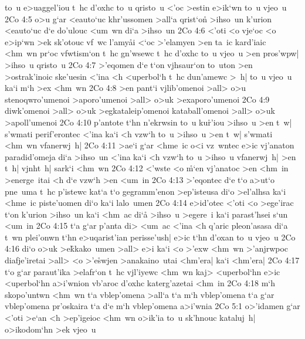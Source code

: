 to~u
e>uaggel'iou
t~hc
d'oxhc
to~u
qristo~u
<'oc
>estin
e>ik`wn
to~u
vjeo~u\bibvsend
\vs 2Co 4:5
o>u
g`ar
<eauto`uc
khr'ussomen
>all`a
qrist`on\r{}
>ihso~un
k'urion
<eauto`uc
d`e
do'ulouc
<um~wn
di`a
>ihso~un\bibvsend
\vs 2Co 4:6
<'oti
<o
vje`oc
<o
e>ip`wn
>ek
sk'otouc
vf~wc
l'amy\r{a}i
<`oc
>'elamyen
>en
ta~ic
kard'iaic
<hm~wn
pr`oc
vfwtism`on
t~hc
gn'wsewc
t~hc
d'oxhc
to~u
vjeo~u
>en
pros'wpw|
>ihso~u
qristo~u\bibvsend
\vs 2Co 4:7
>'eqomen
d`e
t`on
vjhsaur`on
to~uton
>en
>ostrak'inoic
ske'uesin
<'ina
<h
<uperbol`h
t~hc
dun'amewc
>~h|
to~u
vjeo~u
ka`i
m`h
>ex
<hm~wn\bibvsend
\vs 2Co 4:8
>en
pant`i
vjlib'omenoi
>all>
o>u
stenoqwro'umenoi
>aporo'umenoi
>all>
o>uk
>exaporo'umenoi\bibvsend
\vs 2Co 4:9
diwk'omenoi
>all>
o>uk
>egkataleip'omenoi
kataball'omenoi
>all>
o>uk
>apoll'umenoi\bibvsend
\vs 2Co 4:10
p'antote
t`hn
n'ekrwsin
to~u
ku\r{r}'iou
>ihso~u
>en
t~w|
s'wmati
perif'erontec
<'ina
ka`i
<h
vzw`h
to~u
>ihso~u
>en
t~w|
s'wmati
<hm~wn
vfanerwj~h|\bibvsend
\vs 2Co 4:11
>ae`i
g`ar
<hme~ic
o<i
vz~wntec
e>ic
vj'anaton
paradid'omeja
di`a
>ihso~un
<'ina
ka`i
<h
vzw`h
to~u
>ihso~u
vfanerwj~h|
>en
t~h|
vjnht~h|
sark`i
<hm~wn\bibvsend
\vs 2Co 4:12
<'wste
<o
\r{m}`en
vj'anatoc
>en
<hm~in
>energe~itai
<h
d`e
vzw`h
>en
<um~in\bibvsend
\vs 2Co 4:13
>'eqontec
d`e
t`o
a>ut`o
pne~uma
t~hc
p'istewc
kat`a
t`o
gegramm'enon
>ep'isteusa
di`o
>el'alhsa
ka`i
<hme~ic
piste'uomen
di`o
ka`i
lalo~umen\bibvsend
\vs 2Co 4:14
e>id'otec
<'oti
<o
>ege'irac
t`on
k'urion
>ihso~un
ka`i
<hm~ac
di`a\r{}
>ihso~u
>egere~i
ka`i
parast'hsei
s`un
<um~in\bibvsend
\vs 2Co 4:15
t`a
g`ar
p'anta
di>
<um~ac
<'ina
<h
q'aric
pleon'asasa
di`a
t~wn
plei'onwn
t`hn
e>uqarist'ian
perisse'ush|
e>ic
t`hn
d'oxan
to~u
vjeo~u\bibvsend
\vs 2Co 4:16
di`o
o>uk
>e\r{k}kako~umen
>all>
e>i
ka`i
<o
>'exw
<hm~wn
>'anjrwpoc
diafje'iretai
>all>
<o
>'e\r{s}wjen
>anakaino~utai
<hm'era|
ka`i
<hm'era|\bibvsend
\vs 2Co 4:17
t`o
g`ar
paraut'ika
>elafr`on
t~hc
vjl'iyewc
<hm~wn
kaj>
<uperbol`hn
e>ic
<uperbol`hn
a>i'wnion
vb'aroc
d'oxhc
katerg'azetai
<hm~in\bibvsend
\vs 2Co 4:18
m`h
skopo'untwn
<hm~wn
t`a
vblep'omena
>all`a
t`a
m`h
vblep'omena
t`a
g`ar
vblep'omena
pr'oskaira
t`a
d`e
m`h
vblep'omena
a>i'wnia\bibvsend
\vs 2Co 5:1
o>'idamen
g`ar
<'oti
>e`an
<h
>ep'igeioc
<hm~wn
o>ik'ia
to~u
sk'hnouc
kataluj~h|
o>ikodom`hn
>ek
vjeo~u
